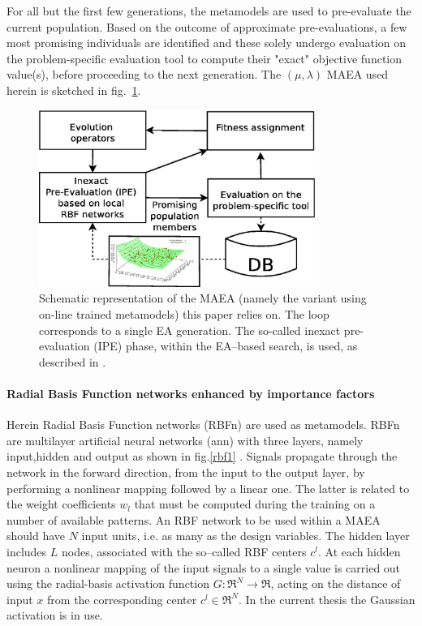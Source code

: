 For all but the first few generations, the metamodels are used to pre-evaluate the current population. Based on the outcome of approximate pre-evaluations, a few most promising individuals are identified and these solely undergo evaluation on the problem-specific evaluation tool to compute their "exact" objective function value(s), before proceeding to the next generation. The $(\mu,\lambda)$ MAEA used herein is sketched in fig.~\ref{MAEA}.


\begin{figure}[h!]
\centering
\includegraphics[width=90mm]{MAEA.eps} 
\caption{Schematic representation of the MAEA (namely the variant using on-line trained metamodels) this paper relies on. The loop corresponds to a single EA generation. The so-called inexact pre-evaluation (IPE) phase, within the EA--based search, is used, as described in \cite{LTT_2_020,LTT_2_029}. }
\label{MAEA}
\end{figure}


\paragraph{Radial Basis Function networks enhanced by importance factors}
Herein Radial Basis Function networks (RBFn) are used as metamodels. RBFn are multilayer artificial neural networks (ann) with three layers, namely input,hidden and output as shown in fig.\ref{rbf1} \cite{Haykin}. Signals propagate through the network in the forward direction, from the input to the output layer, by performing a nonlinear mapping followed by a linear one. The latter is related to the weight coefficients $w_l$ that must be computed during the training on a number of available patterns. An RBF network to be used within a MAEA should have $N$ input units, i.e. as many as the  design variables. The hidden layer includes $L$ nodes, associated with the so–called RBF centers $c^l$. At each hidden neuron a nonlinear mapping of the input signals to a single value is carried out using the radial-basis activation function $G:\Re^N \rightarrow \Re$, acting on the distance of input $x$ from the corresponding center $c^l \in \Re^N$.  In the current thesis the Gaussian activation is in use. 

